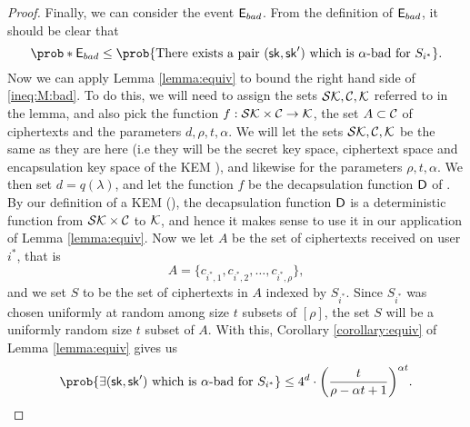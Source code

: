 \begin{proof}
  Finally, we can consider the event \(\mathsf{E}_{bad}\).
  From the definition of \(\mathsf{E}_{bad}\), it should be clear that
  \begin{equation}\label{ineq:M:bad}
    \prob*{\eventE_{bad}} \le \prob{\text{There exists a pair } (\sk,\sk') \text{ which is \(\alpha\)-bad for } S_{i^{*}}}.
  \end{equation}
  Now we can apply Lemma \ref{lemma:equiv} to bound the right hand side of \eqref{ineq:M:bad}.
  To do this, we will need to assign the sets \(\mathcal{SK}, \mathcal{C}, \mathcal{K}\) referred to in the lemma,
  and also pick the function \(f : \mathcal{SK} \times \mathcal{C} \to \mathcal{K}\),
  the set \(A \subset \mathcal{C}\) of ciphertexts and the parameters \(d,\rho,t,\alpha\).
  We will let the sets \(\mathcal{SK}, \mathcal{C}, \mathcal{K}\)
  be the same as they are here (i.e they will be the secret key space, ciphertext space and encapsulation key space of the KEM \KEM), and likewise for the parameters \(\rho, t, \alpha\).
  We then set \(d = q(\lambda)\),
  and let the function \(f\) be the decapsulation function \(\mathsf{D}\) of \KEM.
  By our definition of a KEM (), the decapsulation function
  \(\mathsf{D}\) is a deterministic function from \(\mathcal{SK} \times \mathcal{C}\) to \(\mathcal{K}\),
  and hence it makes sense to use it in our application of Lemma \ref{lemma:equiv}.
  Now we let \(A\) be the set of ciphertexts received on user \(i^{*}\), that is
  \[
    A = \{c_{i^{*},1},c_{i^{*},2},\ldots,c_{i^{*},\rho}\},
  \]
  and we set \(S\) to be the set of ciphertexts in \(A\) indexed by \(S_{i^{*}}\).
  Since \(S_{i^{*}}\) was chosen uniformly at random among size \(t\) subsets of \([\rho]\),
  the set \(S\) will be a uniformly random size \(t\) subset of \(A\).
  With this, Corollary \ref{corollary:equiv} of Lemma \ref{lemma:equiv} gives us
  \[
    \prob{\exists (\sk,\sk') \text{ which is \(\alpha\)-bad for } S_{i^{*}}}
    \le 4^{d} \cdot \left( \frac{t}{\rho - \alpha t + 1} \right)^{\alpha t}.
  \]


\end{proof}
